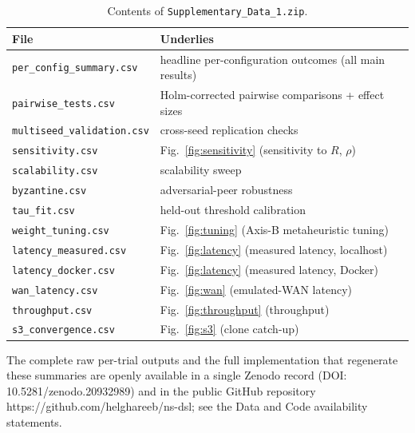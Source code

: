 \documentclass[11pt]{article}
\begin{document}
\begin{table}[h]\centering
\caption{Contents of \texttt{Supplementary\_Data\_1.zip}.}
\label{tab:sidata}
\small
\begin{tabularx}{\textwidth}{@{}lX@{}}
\toprule
File & Underlies \\
\midrule
\texttt{per\_config\_summary.csv}   & headline per-configuration outcomes (all main results) \\
\texttt{pairwise\_tests.csv}        & Holm-corrected pairwise comparisons + effect sizes \\
\texttt{multiseed\_validation.csv}  & cross-seed replication checks \\
\texttt{sensitivity.csv}            & Fig.~\ref{fig:sensitivity} (sensitivity to $R$, $\rho$) \\
\texttt{scalability.csv}            & scalability sweep \\
\texttt{byzantine.csv}              & adversarial-peer robustness \\
\texttt{tau\_fit.csv}               & held-out threshold calibration \\
\texttt{weight\_tuning.csv}         & Fig.~\ref{fig:tuning} (Axis-B metaheuristic tuning) \\
\texttt{latency\_measured.csv}      & Fig.~\ref{fig:latency} (measured latency, localhost) \\
\texttt{latency\_docker.csv}        & Fig.~\ref{fig:latency} (measured latency, Docker) \\
\texttt{wan\_latency.csv}           & Fig.~\ref{fig:wan} (emulated-WAN latency) \\
\texttt{throughput.csv}             & Fig.~\ref{fig:throughput} (throughput) \\
\texttt{s3\_convergence.csv}        & Fig.~\ref{fig:s3} (clone catch-up) \\
\bottomrule
\end{tabularx}
\end{table}

The complete raw per-trial outputs and the full implementation that regenerate these summaries are
openly available in a single Zenodo record (DOI: 10.5281/zenodo.20932989) and in the public GitHub
repository https://github.com/helghareeb/ns-dsl; see the Data and Code availability statements.
\end{document}
